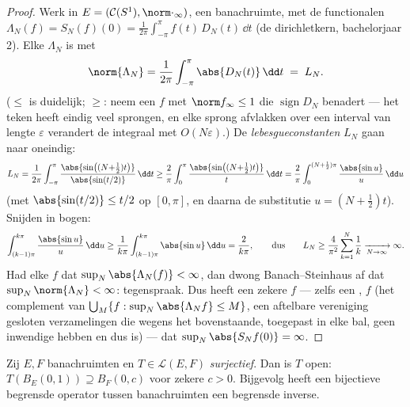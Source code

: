 \begin{proof}
Werk in $E = (\mathcal C(S^1), \norm\cdot_\infty)$, een
banachruimte, met de functionalen $\Lambda_N(f) = S_N(f)(0) =
\frac1{2\pi}\int_{-\pi}^{\pi}f(t)\,D_N(t)\,\dd t$ (de
dirichletkern, bachelorjaar 2). Elke $\Lambda_N$ is  met
\[
\norm{\Lambda_N} = \frac1{2\pi}\int_{-\pi}^\pi\abs{D_N(t)}\,\dd
t \;=\; L_N .
\]
($\leq$ is duidelijk; $\geq$: neem een  $f$ met $\norm
f_\infty \leq 1$ die $\operatorname{sign}D_N$ benadert --- het
teken heeft eindig veel sprongen, en elke sprong afvlakken over
een interval van lengte $\varepsilon$ verandert de integraal met
$O(N\varepsilon)$.) De \emph{lebesgueconstanten} $L_N$ gaan naar
oneindig:
\[
L_N = \frac1{2\pi}\int_{-\pi}^{\pi}
\frac{\abs{\sin\bigl((N{+}\tfrac12)t\bigr)}}{\abs{\sin(t/2)}}
\,\dd t
\geq \frac{2}{\pi}\int_0^{\pi}
\frac{\abs{\sin\bigl((N{+}\tfrac12)t\bigr)}}{t}\,\dd t
= \frac{2}{\pi}\int_0^{(N+\frac12)\pi}\frac{\abs{\sin
u}}{u}\,\dd u
\]
(met $\abs{\sin(t/2)} \leq t/2$ op $[0, \pi]$, en daarna de
substitutie $u = (N + \tfrac12)t$). Snijden in bogen:
\[
\int_{(k-1)\pi}^{k\pi}\frac{\abs{\sin u}}u\,\dd u
\geq \frac1{k\pi}\int_{(k-1)\pi}^{k\pi}\abs{\sin u}\,\dd u =
\frac{2}{k\pi},
\qquad\text{dus}\qquad
L_N \geq \frac{4}{\pi^2}\sum_{k=1}^N\frac1k
\xrightarrow[N\to\infty]{} \infty .
\]
Had elke  $f$ dat $\sup_N \abs{\Lambda_N(f)} < \infty$,
dan dwong Banach--Steinhaus af dat $\sup_N\norm{\Lambda_N} <
\infty$: tegenspraak. Dus heeft een zekere $f$ --- zelfs een
,  $f$ (het complement van
$\bigcup_M\{f: \sup_N\abs{\Lambda_Nf}\leq M\}$, een aftelbare
vereniging gesloten verzamelingen die wegens het bovenstaande,
toegepast in elke bal, geen inwendige hebben en dus  is) ---
dat $\sup_N\abs{S_Nf(0)} = \infty$.
\end{proof}

\begin{theorem}\label{thm:b3:banach:openmapping}
Zij $E, F$ banachruimten en $T \in \mathcal L(E, F)$
\emph{surjectief}. Dan is $T$ open: $T(B_E(0,1)) \supseteq B_F(0,
c)$ voor zekere $c > 0$. Bijgevolg heeft een bijectieve begrensde
operator tussen banachruimten een begrensde
inverse.
\end{theorem}

